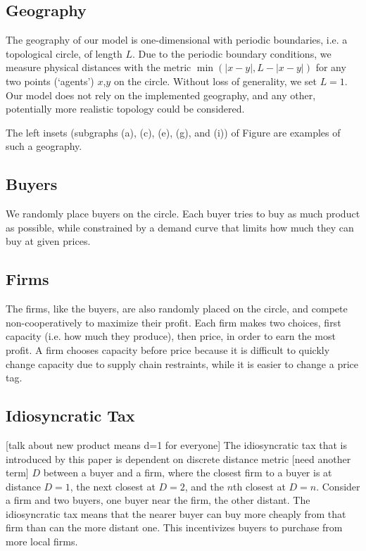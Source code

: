 \documentclass[11pt]{article}
\begin{document}
\subsection{Geography}
The geography of our model is one-dimensional with periodic boundaries, i.e.
a topological circle, of length $L$. Due to the periodic boundary conditions,
we measure physical distances with the metric $\min(|x-y|, L-|x-y|)$ for any
two points (`agents') $x$,$y$ on the circle. Without loss of generality, we set
$L=1$. Our model does not rely on the implemented geography, and any other,
potentially more realistic topology could be considered.

The left insets (subgraphs (a), (c), (e), (g), and (i)) of Figure
\pageref{fig:fig3x2SingleTimestep} are examples of such a geography.

\subsection{Buyers}
We randomly place buyers on the circle. Each buyer tries to buy as much product
as possible, while constrained by a demand curve that limits how much they can
buy at given prices. 

\subsection{Firms}
The firms, like the buyers, are also randomly placed on the circle, and compete
non-cooperatively to maximize their profit. Each firm makes two choices, first
capacity (i.e. how much they produce), then price, in order to earn the most
profit. A firm chooses capacity before price because it is difficult to quickly
change capacity due to supply chain restraints, while it is easier to change a
price tag.

\subsection{Idiosyncratic Tax}
[talk about new product means d=1 for everyone]
The idiosyncratic tax that is introduced by this paper is dependent on 
discrete distance metric [need another term] $D$ between a buyer and a firm,
where the closest firm to a buyer is at distance $D=1$, the next closest at
$D=2$, and the $n$th closest at $D=n$. Consider a firm and two buyers, one
buyer near the firm, the other distant. The idiosyncratic tax means that the
nearer buyer can buy more cheaply from that firm than can the more distant one.
This incentivizes buyers to purchase from more local firms.
\end{document}

